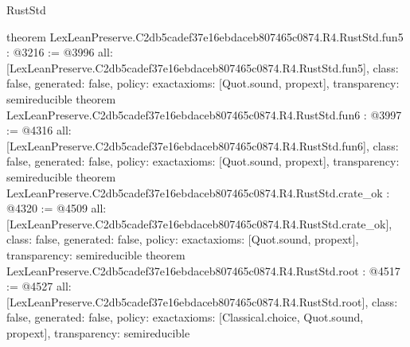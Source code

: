 \begin{lexlean}{RustStd}
\begin{coremodule}
{}
theorem LexLeanPreserve.C2db5cadef37e16ebdaceb807465c0874.R4.RustStd.fun5 : @3216 := @3996 {
  all: [LexLeanPreserve.C2db5cadef37e16ebdaceb807465c0874.R4.RustStd.fun5],
  class: false,
  generated: false,
  policy: exact{axioms: [Quot.sound, propext]},
  transparency: semireducible
}
theorem LexLeanPreserve.C2db5cadef37e16ebdaceb807465c0874.R4.RustStd.fun6 : @3997 := @4316 {
  all: [LexLeanPreserve.C2db5cadef37e16ebdaceb807465c0874.R4.RustStd.fun6],
  class: false,
  generated: false,
  policy: exact{axioms: [Quot.sound, propext]},
  transparency: semireducible
}
theorem LexLeanPreserve.C2db5cadef37e16ebdaceb807465c0874.R4.RustStd.crate_ok : @4320 := @4509 {
  all: [LexLeanPreserve.C2db5cadef37e16ebdaceb807465c0874.R4.RustStd.crate_ok],
  class: false,
  generated: false,
  policy: exact{axioms: [Quot.sound, propext]},
  transparency: semireducible
}
theorem LexLeanPreserve.C2db5cadef37e16ebdaceb807465c0874.R4.RustStd.root : @4517 := @4527 {
  all: [LexLeanPreserve.C2db5cadef37e16ebdaceb807465c0874.R4.RustStd.root],
  class: false,
  generated: false,
  policy: exact{axioms: [Classical.choice, Quot.sound, propext]},
  transparency: semireducible
}


\end{coremodule}
\end{lexlean}
